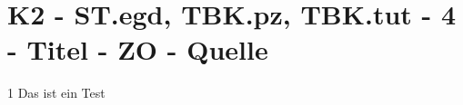 \section{K2 - ST.egd, TBK.pz, TBK.tut - 4 - Titel - ZO - Quelle}

\begin{langesbeispiel}\item[1] %
Das ist ein Test

\end{langesbeispiel}